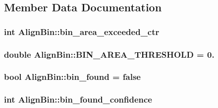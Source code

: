 \subsection{Member Data Documentation}
\subsubsection[{\texorpdfstring{bin\+\_\+area\+\_\+exceeded\+\_\+ctr}{bin_area_exceeded_ctr}}]{\setlength{\rightskip}{0pt plus 5cm}int Align\+Bin\+::bin\+\_\+area\+\_\+exceeded\+\_\+ctr}\hypertarget{classAlignBin_abc20afd816e513b776e6a14ecd522379}{}\label{classAlignBin_abc20afd816e513b776e6a14ecd522379}
\subsubsection[{\texorpdfstring{B\+I\+N\+\_\+\+A\+R\+E\+A\+\_\+\+T\+H\+R\+E\+S\+H\+O\+LD}{BIN_AREA_THRESHOLD}}]{\setlength{\rightskip}{0pt plus 5cm}double Align\+Bin\+::\+B\+I\+N\+\_\+\+A\+R\+E\+A\+\_\+\+T\+H\+R\+E\+S\+H\+O\+LD = 0.}\hypertarget{classAlignBin_a5c32224007789c06f6be5714512ca506}{}\label{classAlignBin_a5c32224007789c06f6be5714512ca506}
\subsubsection[{\texorpdfstring{bin\+\_\+found}{bin_found}}]{\setlength{\rightskip}{0pt plus 5cm}bool Align\+Bin\+::bin\+\_\+found = false}\hypertarget{classAlignBin_a4bf78a8707f32a306a8871c438c93fc5}{}\label{classAlignBin_a4bf78a8707f32a306a8871c438c93fc5}
\subsubsection[{\texorpdfstring{bin\+\_\+found\+\_\+confidence}{bin_found_confidence}}]{\setlength{\rightskip}{0pt plus 5cm}int Align\+Bin\+::bin\+\_\+found\+\_\+confidence}\hypertarget{classAlignBin_a17f0142a68dbcdd10faf27361e5e4098}{}\label{classAlignBin_a17f0142a68dbcdd10faf27361e5e4098}


